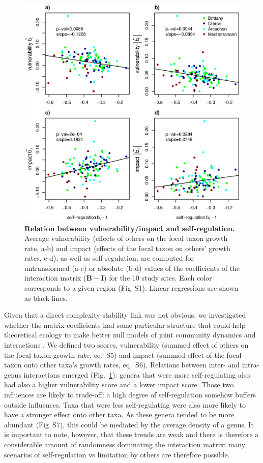 \documentclass[10pt]{article}
\begin{document}
\begin{figure}[!ht]
\centering \includegraphics[width=1\textwidth]{pencen_generality_vs_vulnerability_MainFig}
\caption{\textbf{Relation between vulnerability/impact and self-regulation.}
Average vulnerability (effects of others on the focal taxon growth
rate, a-b) and impact (effects of the focal taxon on others' growth
rates, c-d), as well as self-regulation, are computed for untransformed
(a-c) or absolute (b-d) values of the coefficients of the interaction
matrix ($\mathbf{B}-\mathbf{I}$) for the 10 study sites. Each color
corresponds to a given region (Fig~S1). Linear regressions are shown
as black lines.}
\label{fig:Vulnerability_impact}
\end{figure}

Given that a direct complexity-stability link was not obvious, we
investigated whether the matrix coefficients had some particular structure
that could help theoretical ecology to make better null models of
joint community dynamics and interactions \citep{james_constructing_2015}.
We defined two scores, vulnerability (summed effect of others on the
focal taxon growth rate, eq.~S5) and impact (summed effect of the
focal taxon onto other taxa's growth rates, eq.~S6). Relations between
inter- and intra-genus interactions emerged (Fig.~\ref{fig:Vulnerability_impact}):
genera that were more self-regulating also had also a higher vulnerability
score and a lower impact score. Those two influences are likely to
trade-off: a high degree of self-regulation somehow buffers outside
influences. Taxa that were less self-regulating were also more likely
to have a stronger effect onto other taxa. As these genera
tended to be more abundant (Fig~S7), this could be mediated by the average density of a genus. It is important to note, however, that these trends
are weak and there is therefore a considerable amount of randomness
dominating the interaction matrix: many scenarios of self-regulation
vs limitation by others are therefore possible.
\end{document}
